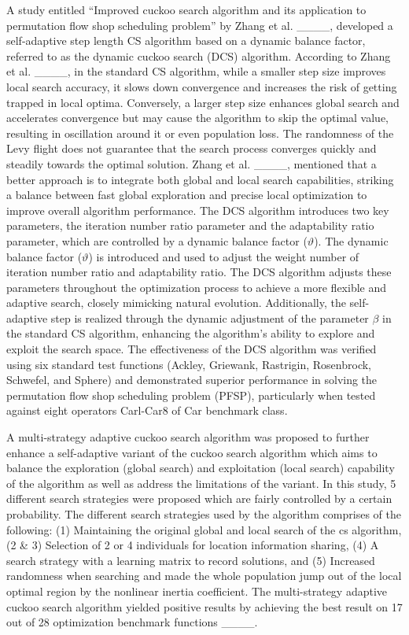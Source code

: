 A study entitled “Improved cuckoo search algorithm and its application to permutation flow shop scheduling problem” by Zhang et al. ____, developed a self-adaptive step length CS algorithm based on a dynamic balance factor, referred to as the dynamic cuckoo search (DCS) algorithm. According to Zhang et al. ____, in the standard CS algorithm, while a smaller step size improves local search accuracy, it slows down convergence and increases the risk of getting trapped in local optima. Conversely, a larger step size enhances global search and accelerates convergence but may cause the algorithm to skip the optimal value, resulting in oscillation around it or even population loss. The randomness of the Levy flight does not guarantee that the search process converges quickly and steadily towards the optimal solution. Zhang et al. ____, mentioned that a better approach is to integrate both global and local search capabilities, striking a balance between fast global exploration and precise local optimization to improve overall algorithm performance. The DCS algorithm introduces two key parameters, the iteration number ratio parameter and the adaptability ratio parameter, which are controlled by a dynamic balance factor ($\vartheta$). The dynamic balance factor ($\vartheta$) is introduced and used to adjust the weight number of iteration number ratio and adaptability ratio. The DCS algorithm adjusts these parameters throughout the optimization process to achieve a more flexible and adaptive search, closely mimicking natural evolution. Additionally, the self-adaptive step is realized through the dynamic adjustment of the parameter $\beta$ in the standard CS algorithm, enhancing the algorithm’s ability to explore and exploit the search space. The effectiveness of the DCS algorithm was verified using six standard test functions (Ackley, Griewank, Rastrigin, Rosenbrock, Schwefel, and Sphere) and demonstrated superior performance in solving the permutation flow shop scheduling problem (PFSP), particularly when tested against eight operators Carl-Car8 of Car benchmark class.

A multi-strategy adaptive cuckoo search algorithm was proposed to further enhance a self-adaptive variant of the cuckoo search algorithm which aims to balance the exploration (global search) and exploitation (local search) capability of the algorithm as well as address the limitations of the variant. In this study, 5 different search strategies were proposed which are fairly controlled by a certain probability. The different search strategies used by the algorithm comprises of the following: (1) Maintaining the original global and local search of the cs algorithm, (2 \& 3) Selection of 2 or 4 individuals for location information sharing, (4) A search strategy with a learning matrix to record solutions, and (5) Increased randomness when searching and made the whole population jump out of the local optimal region by the nonlinear inertia coefficient. The multi-strategy adaptive cuckoo search algorithm yielded positive results by achieving the best result on 17 out of 28 optimization benchmark functions ____.

